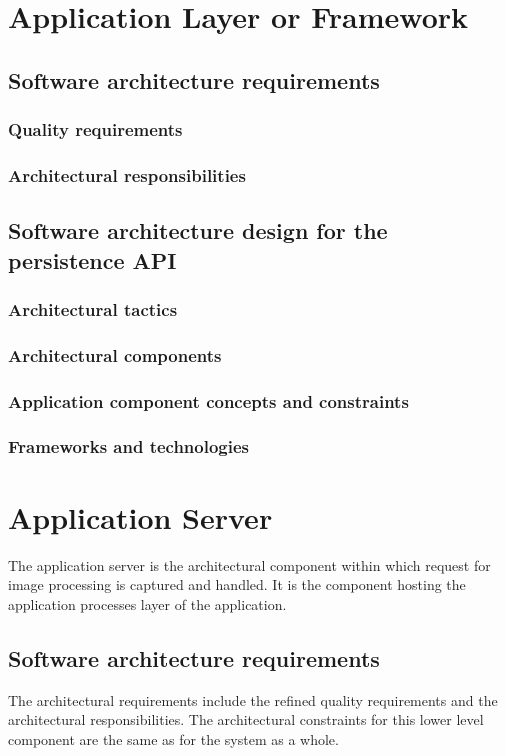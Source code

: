 \documentclass[a4paper,12pt]{report}
\begin{document}
\section {Application Layer or Framework}
\subsection {Software architecture requirements}
\subsubsection {Quality requirements}
\subsubsection {Architectural responsibilities}

\subsection {Software architecture design for the persistence API}
\subsubsection {Architectural tactics}
\subsubsection {Architectural components}
\subsubsection {Application component concepts and constraints}
\subsubsection {Frameworks and technologies}

\section {Application Server}
The application server is the architectural component within which request for image processing is captured and handled. It is the component hosting the application processes layer of the application.

\subsection {Software architecture requirements}
The architectural requirements include the refined quality requirements and the architectural responsibilities. The architectural constraints for this lower level component are the same as for the system as a whole.
\end{document}
